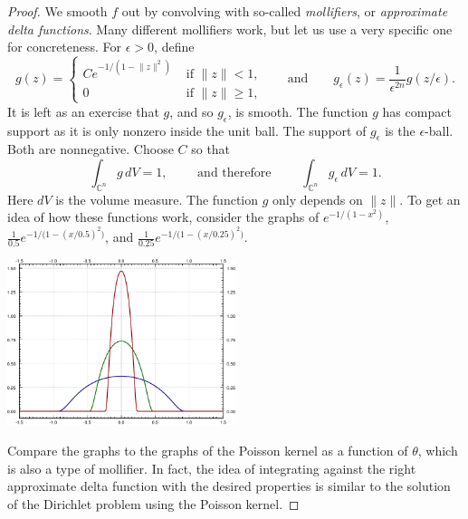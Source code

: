 \documentclass[12pt,openany]{book}
\newcommand{\snorm}[1]{\lVert {#1} \rVert}
\newcommand{\C}{{\mathbb{C}}}
\theoremstyle{plain}
\theoremstyle{remark}
\theoremstyle{definition}
\newenvironment{myfig}{%
    \begin{center}
}{%
    \end{center}
}
\theoremstyle{exercise}
\theoremstyle{example}
\begin{document}
\begin{proof}
We smooth $f$ out by convolving with so-called
\emph{mollifiers}, or
\emph{approximate delta functions}.
Many different mollifiers 
work, but let us use a very specific one for concreteness.
For $\epsilon > 0$, define 
\begin{equation*}
g(z) = 
\begin{cases}
C e^{-1/(1-\snorm{z}^2)} & \text{ if $\snorm{z} < 1$,}
\\
0 & \text{ if $\snorm{z} \geq 1$,}
\end{cases}
\qquad
\text{and}
\qquad
g_\epsilon(z) = \frac{1}{\epsilon^{2n}} g(z/\epsilon) .
\end{equation*}
It is left as an exercise that $g$, and so $g_\epsilon$, is smooth.
The function $g$ has compact
support as it is only nonzero inside the unit ball.  The support of
$g_\epsilon$ is the $\epsilon$-ball.  Both are nonnegative.  Choose $C$ so that
\begin{equation*}
\int_{\C^n} g\, dV = 1 ,
\qquad \text{ and therefore } \qquad
\int_{\C^n} g_\epsilon\, dV = 1 .
\end{equation*}
%
Here $dV$ is the volume measure.
The function $g$ only depends on $\snorm{z}$.
To get an idea of
how these functions work, consider the graphs of
$e^{-1/(1-x^2)}$,
$\frac{1}{0.5}e^{-1/\bigl(1-{(x/0.5)}^2\bigr)}$, and
$\frac{1}{0.25}e^{-1/\bigl(1-{(x/0.25)}^2\bigr)}$.

\begin{myfig}
\includegraphics[width=0.5\textwidth]{figures/graph-of-mollifier.pdf}
\end{myfig}

Compare the graphs to the graphs of the Poisson kernel as a function of
$\theta$, which is also a type of mollifier.  In fact, the idea of
integrating against the right approximate delta function with the desired properties
is similar to the solution of the Dirichlet
problem using the Poisson kernel.


\end{proof}
\end{document}
